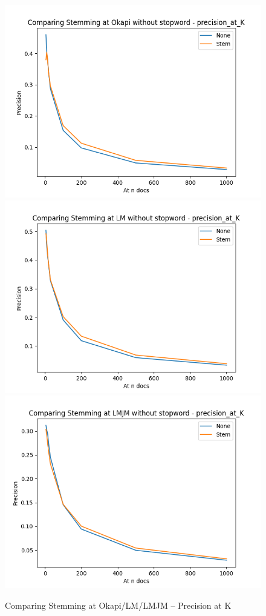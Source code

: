 \documentclass[10pt, a4paper]{article}
\begin{document}
\begin{figure}[h!]
\centering
\includegraphics[scale=0.3]{compare stem/Comparing Stemming at Okapi without stopword - precision_at_K-pak.png}
\includegraphics[scale=0.3]{compare stem/Comparing Stemming at LM without stopword - precision_at_K-pak.png}
\includegraphics[scale=0.3]{compare stem/Comparing Stemming at LMJM without stopword - precision_at_K-pak.png}
\caption{Comparing Stemming at Okapi/LM/LMJM -- Precision at K}
\label{fig:stemming_p}
\end{figure}
\end{document}
